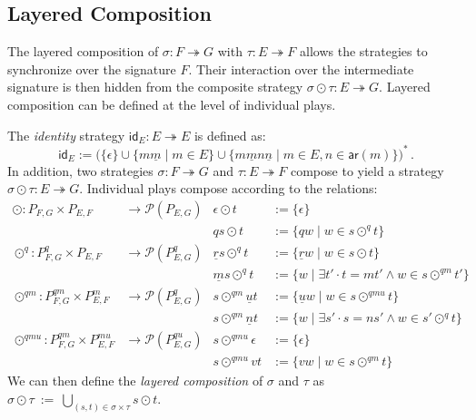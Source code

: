 \documentclass[acmsmall,nonacm]{acmart}
\newcommand{\kw}[1]{\ensuremath{ \mathsf{#1} }}
\begin{document}

\subsection{Layered Composition}
\label{sec:strategy:lcomp}

The layered
composition of
$\sigma : F \twoheadrightarrow G$ with
$\tau : E \twoheadrightarrow F$
allows the strategies to synchronize
over the signature $F$.
Their interaction over the intermediate signature is then hidden from
the composite strategy $\sigma \odot \tau : E \twoheadrightarrow G$.
Layered composition can be defined
at the level of individual plays.

\begin{definition} \label{def:lcomp} %
The \emph{identity} strategy $\kw{id}_E : E \twoheadrightarrow E$
is defined as:
\[
  \kw{id}_E :=
    \bigl(
      \{\epsilon\} \cup 
      \{ m \underline{m} \mid m \in E \} \cup
      \{ m \underline{m} n \underline{n} \mid m \in E, n \in \kw{ar}(m) \}
    \bigr)^*
  \,.
\]
In addition, two strategies
$\sigma : F \twoheadrightarrow G$ and
$\tau : E \twoheadrightarrow F$
compose to yield a strategy
$\sigma \odot \tau : E \twoheadrightarrow G$.
Individual plays compose
according to the relations:
\begin{align*}
  {\odot} : P_{F,G} \times P_{E,F}
    &\rightarrow \mathcal{P}(P_{E,G}) &
  \epsilon \odot t &:= \{ \epsilon \} \\&&
  qs \odot t &:= \{ qw \mid w \in s \odot^q t \}
  \\
  {\odot}^q : P_{F,G}^q \times P_{E,F}
    &\rightarrow \mathcal{P}(P_{E,G}^q) &
  \underline{r} s \odot^q t &:=
    \{ \underline{r} w \mid w \in s \odot t \} \\&&
  \underline{m} s \odot^q t &:=
    \{ w \mid \exists t' \cdot t = mt' \wedge w \in s \odot^{qm} t' \}
  \\
  {\odot}^{qm} : P_{F,G}^{qm} \times P_{E,F}^m
    &\rightarrow \mathcal{P}(P_{E,G}^q) &
  s \odot^{qm} \underline{u} t &:=
    \{ \underline{u} w \mid w \in s \odot^{qmu} t \} \\&&
  s \odot^{qm} \underline{n} t &:=
    \{ w \mid \exists s' \cdot s = ns' \wedge w \in s' \odot^q t \}
  \\
  {\odot}^{qmu} : P_{F,G}^{qm} \times P_{E,F}^{mu}
    &\rightarrow \mathcal{P}(P_{E,G}^{qu}) &
  s \odot^{qmu} \epsilon &:= \{ \epsilon \} \\&&
  s \odot^{qmu} v t &:= \{ v w \mid w \in s \odot^{qm} t \}
\end{align*}
We can then define the \emph{layered composition} of $\sigma$ and $\tau$ as
$
  \sigma \odot \tau \: := \:
    \bigcup_{(s,t) \in \sigma \times \tau}
      s \odot t
$.
\end{definition}
\end{document}
